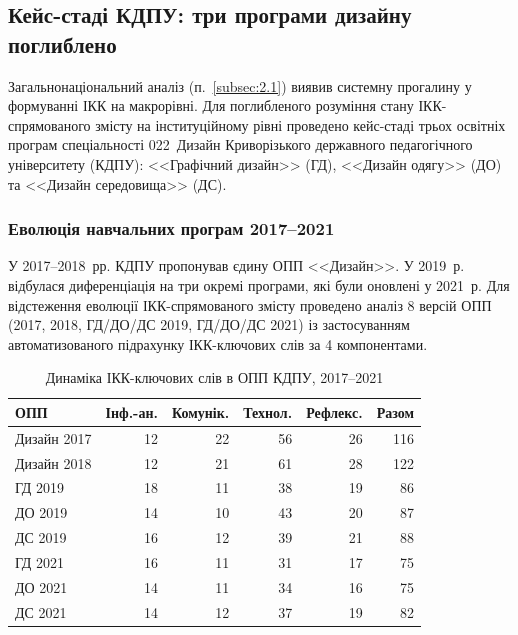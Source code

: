 \subsection{Кейс-стаді КДПУ: три програми дизайну поглиблено}\label{subsec:2.2}

Загальнонаціональний аналіз (п.~\ref{subsec:2.1}) виявив системну прогалину у формуванні ІКК на макрорівні. Для поглибленого розуміння стану ІКК-спрямованого змісту на інституційному рівні проведено кейс-стаді трьох освітніх програм спеціальності 022~Дизайн Криворізького державного педагогічного університету (КДПУ): <<Графічний дизайн>> (ГД), <<Дизайн одягу>> (ДО) та <<Дизайн середовища>> (ДС).

\subsubsection{Еволюція навчальних програм 2017--2021}\label{sssec:2.2.1}

У 2017--2018~рр. КДПУ пропонував єдину ОПП <<Дизайн>>. У 2019~р. відбулася диференціація на три окремі програми, які були оновлені у 2021~р. Для відстеження еволюції ІКК-спрямованого змісту проведено аналіз 8 версій ОПП (2017, 2018, ГД/ДО/ДС 2019, ГД/ДО/ДС 2021) із застосуванням автоматизованого підрахунку ІКК-ключових слів за 4 компонентами.

\begin{table}[htbp]
\centering
\caption{Динаміка ІКК-ключових слів в ОПП КДПУ, 2017--2021}\label{tab:opp-evolution}
\small
\begin{tabularx}{\textwidth}{@{}Xrrrrr@{}}
\toprule
\textbf{ОПП} & \textbf{Інф.-ан.} & \textbf{Комунік.} & \textbf{Технол.} & \textbf{Рефлекс.} & \textbf{Разом} \\
\midrule
Дизайн 2017 & 12 & 22 & 56 & 26 & 116 \\
Дизайн 2018 & 12 & 21 & 61 & 28 & 122 \\
\addlinespace
ГД 2019 & 18 & 11 & 38 & 19 & 86 \\
ДО 2019 & 14 & 10 & 43 & 20 & 87 \\
ДС 2019 & 16 & 12 & 39 & 21 & 88 \\
\addlinespace
ГД 2021 & 16 & 11 & 31 & 17 & 75 \\
ДО 2021 & 14 & 11 & 34 & 16 & 75 \\
ДС 2021 & 14 & 12 & 37 & 19 & 82 \\
\bottomrule
\end{tabularx}
\end{table}

